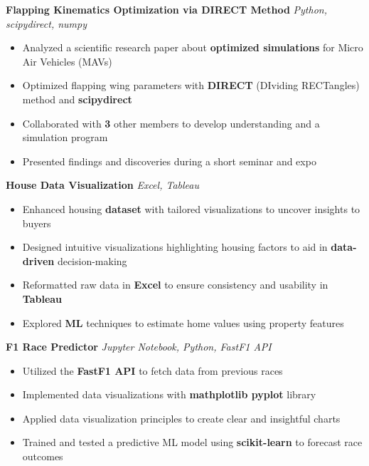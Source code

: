 
\textbf{Flapping Kinematics Optimization via DIRECT Method {\textbar}}
\textit{
{
Python,
scipydirect,
numpy}
}
\begin{itemize}[itemsep=0pt, topsep=0pt]
\item Analyzed a scientific research paper about \textbf{optimized simulations} for Micro Air Vehicles (MAVs)
\item Optimized flapping wing parameters with \textbf{DIRECT} (DIviding RECTangles) method and \textbf{scipydirect}
\item Collaborated with \textbf{3} other members to develop understanding and a simulation program
\item Presented findings and discoveries during a short seminar and expo
\end{itemize}


\textbf{House Data Visualization {\textbar}}
\textit{
{
Excel,
Tableau}
}
\begin{itemize}[itemsep=0pt, topsep=0pt]
\item Enhanced housing \textbf{dataset} with tailored visualizations to uncover insights to buyers
\item Designed intuitive visualizations highlighting housing factors to aid in \textbf{data-driven} decision-making
\item Reformatted raw data in \textbf{Excel} to ensure consistency and usability in \textbf{Tableau}
\item Explored \textbf{ML} techniques to estimate home values using property features
\end{itemize}

\textbf{F1 Race Predictor {\textbar}}
\textit{
{
Jupyter Notebook,
Python,
FastF1 API
}
}
\begin{itemize}[itemsep=0pt, topsep=0pt]
\item Utilized the \textbf{FastF1 API} to fetch data from previous races
\item Implemented data visualizations with \textbf{mathplotlib pyplot} library
\item Applied data visualization principles to create clear and insightful charts
\item Trained and tested a predictive ML model using \textbf{scikit-learn} to forecast race outcomes
\end{itemize}


